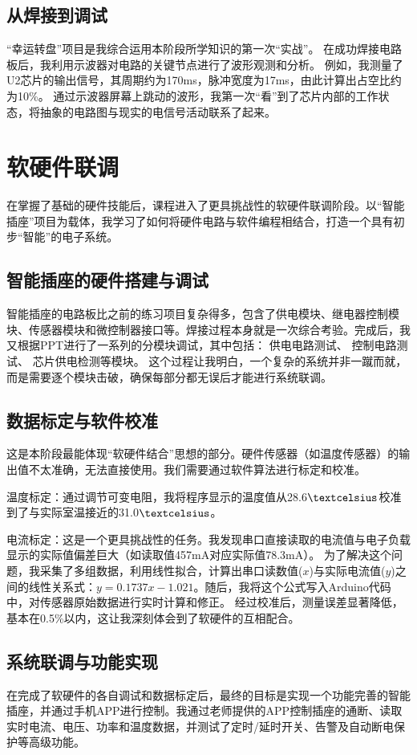 \documentclass[UTF8]{ctexart}
\begin{document}
\subsection{从焊接到调试}
“幸运转盘”项目是我综合运用本阶段所学知识的第一次“实战”。
在成功焊接电路板后，我利用示波器对电路的关键节点进行了波形观测和分析。
例如，我测量了U2芯片的输出信号，其周期约为170ms，脉冲宽度为17ms，由此计算出占空比约为10\%。
通过示波器屏幕上跳动的波形，我第一次“看”到了芯片内部的工作状态，将抽象的电路图与现实的电信号活动联系了起来。

\section{软硬件联调}
在掌握了基础的硬件技能后，课程进入了更具挑战性的软硬件联调阶段。以“智能插座”项目为载体，我学习了如何将硬件电路与软件编程相结合，打造一个具有初步“智能”的电子系统。

\subsection{智能插座的硬件搭建与调试}
智能插座的电路板比之前的练习项目复杂得多，包含了供电模块、继电器控制模块、传感器模块和微控制器接口等。焊接过程本身就是一次综合考验。完成后，我又根据PPT进行了一系列的分模块调试，其中包括：
供电电路测试、
控制电路测试、
芯片供电检测等模块。
这个过程让我明白，一个复杂的系统并非一蹴而就，而是需要逐个模块击破，确保每部分都无误后才能进行系统联调。

\subsection{数据标定与软件校准}
这是本阶段最能体现“软硬件结合”思想的部分。硬件传感器（如温度传感器）的输出值不太准确，无法直接使用。我们需要通过软件算法进行标定和校准。

温度标定：通过调节可变电阻，我将程序显示的温度值从28.6$\textcelsius$校准到了与实际室温接近的31.0$\textcelsius$。

电流标定：这是一个更具挑战性的任务。我发现串口直接读取的电流值与电子负载显示的实际值偏差巨大（如读取值457mA对应实际值78.3mA）。
为了解决这个问题，我采集了多组数据，利用线性拟合，计算出串口读数值($x$)与实际电流值($y$)之间的线性关系式：$y=0.1737x−1.021$。随后，我将这个公式写入Arduino代码中，对传感器原始数据进行实时计算和修正。
经过校准后，测量误差显著降低，基本在0.5\%以内，这让我深刻体会到了软硬件的互相配合。

\subsection{系统联调与功能实现}
在完成了软硬件的各自调试和数据标定后，最终的目标是实现一个功能完善的智能插座，并通过手机APP进行控制。我通过老师提供的APP控制插座的通断、读取实时电流、电压、功率和温度数据，并测试了定时/延时开关、告警及自动断电保护等高级功能。
\end{document}
